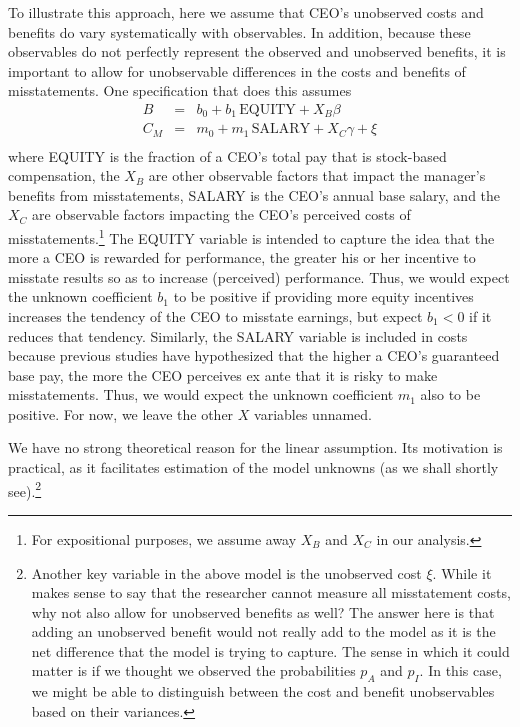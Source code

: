 To illustrate this approach, here we assume that CEO's unobserved costs and benefits do vary systematically with observables.
In addition, because these observables do not perfectly represent the observed and unobserved benefits, it is important to allow for unobservable differences in the costs and benefits of misstatements. 
One specification that does this assumes
\begin{equation}\begin{array}{lcl}\label{eqns1}
B & = & b_0 + b_1 \, \mbox{EQUITY} + X_B\beta\\[.5em]
C_M & = & m_0 + m_1 \, \mbox{SALARY} + X_C\gamma + \xi\\[.5em]
\end{array}
\end{equation}
where EQUITY is the fraction of a CEO's total pay that is stock-based compensation, 
the $X_B$ are other observable factors that impact the manager's benefits from misstatements,
SALARY is the CEO's annual base salary, and the $X_C$ are observable factors impacting the CEO's perceived costs of misstatements.\footnote{
For expositional purposes, we assume away $X_B$ and $X_C$ in our analysis.}
The EQUITY variable is intended to capture the idea that the more a CEO is rewarded for performance, the greater his or her incentive to misstate results so as to increase (perceived) performance.
Thus, we would expect the unknown coefficient $b_1$ to be positive if providing more equity incentives increases the tendency of the CEO to misstate earnings, but expect $b_1 < 0$ if it reduces that tendency.
Similarly, the SALARY variable is included in costs because previous studies have hypothesized that the higher a CEO's guaranteed base pay, the more the CEO perceives ex ante that it is risky to make misstatements.
Thus, we would expect the unknown coefficient $m_1$ also to be positive.
For now, we leave the other $X$ variables unnamed.

We have no strong theoretical reason for the linear assumption. Its motivation is practical, as it facilitates estimation of the model unknowns (as we shall shortly see).\footnote{Another key variable in the above model is the unobserved cost $\xi$.
While it makes sense to say that the researcher cannot measure all misstatement costs, why not also allow for unobserved benefits as well?
The answer here is that adding an unobserved benefit would not really add to the model as it is the net difference that the model is trying to capture.
The sense in which it could matter is if we thought we observed the probabilities $p_A$ and $p_I$.
In this case, we might be able to distinguish between the cost and benefit unobservables based on their variances.}
 
